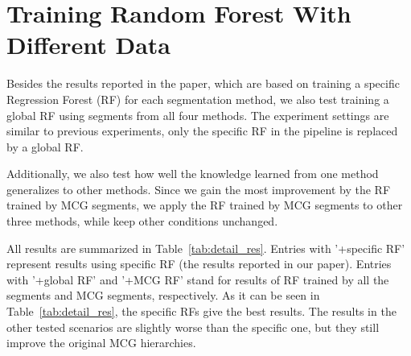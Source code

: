 \section{Training Random Forest With Different Data}

Besides the results reported in the paper, which are based on training a specific Regression Forest (RF) for each segmentation method, we also test training a global RF using segments from all four methods. The experiment settings are similar to previous experiments, only the specific RF in the pipeline is replaced by a global RF. 

Additionally, we also test how well the knowledge learned from one method generalizes to other methods. Since we gain the most improvement by the RF trained by MCG segments, we apply the RF trained by MCG segments to other three methods, while keep other conditions unchanged.

All results are summarized in Table~\ref{tab:detail_res}. Entries with '+specific RF' represent results using specific RF (the results reported in our paper). Entries with '+global RF' and '+MCG RF' stand for results of RF trained by all the segments and MCG segments, respectively. As it can be seen in Table~\ref{tab:detail_res}, the specific RFs give the best results. The results in the other tested scenarios are slightly worse than the specific one, but they still improve the original MCG hierarchies.

